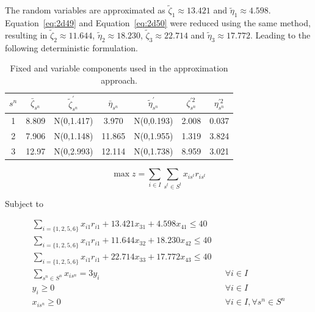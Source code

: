 \documentclass[a4paper,11pt]{article}
\begin{document}
The random variables are approximated as $\tilde{\zeta}_1 \approx 13.421$ and $\tilde{\eta}_1 \approx 4.598$. Equation~\ref{eq:2d49} and Equation~\ref{eq:2d50} were reduced using the same method, resulting in $\tilde{\zeta}_2 \approx 11.644$, $\tilde{\eta}_2 \approx 18.230$, $\tilde{\zeta}_3 \approx 22.714$ and $\tilde{\eta}_3 \approx 17.772$. Leading to the following deterministic formulation.


\begin{table}[]
\caption{Fixed and variable components used in the approximation approach.}
\label{tbl:q2d}
\vspace{12pt}
\centering
\begin{tabular}{ccccccc}
\hline
$s^n$ & $\bar{\zeta}_{s^n}$ & $\tilde{\zeta}_{s^n}^\prime$ & $\bar{\eta}_{s^n}$ & $\tilde{\eta}_{s^n}^\prime$ & $\zeta^{\prime2}_{s^n}$ & $\eta^{\prime2}_{s^n}$\\
\hline
1           & 8.809             & N(0,1.417)      & 3.970      & N(0,0.193) & 2.008 &0.037\\
2           & 7.906             & N(0,1.148)      & 11.865     & N(0,1.955) & 1.319 &3.824\\
3           & 12.97             & N(0,2.993)      & 12.114     & N(0,1.738) & 8.959&3.021\\
 
\hline
\end{tabular}
\end{table}




\begin{equation}
	\max z = \sum_{i\in I}\sum_{s^t \in S^t} x_{is^t}r_{is^t}
\end{equation}

Subject to

\begin{align}
\label{q2e:cons1}
	\sum_{i =\{1,2,5,6\}}x_{i1}r_{i1} + 13.421x_{31} + 4.598x_{41} \leq 40 && \\%
\label{q2e:cons2}
	\sum_{i =\{1,2,5,6\}}x_{i1}r_{i1} + 11.644x_{32} + 18.230x_{42} \leq 40 &&\\ %
\label{q2e:cons3}
	\sum_{i =\{1,2,5,6\}}x_{i1}r_{i1} + 22.714x_{33} + 17.772x_{43} \leq 40 &&\\ %
\label{q2e:cons4}
	\sum_{s^n \in S^n}x_{is^n}=3y_i &&  \forall i \in I \\
\label{q2e:cons5}
	 y_i \geq 0 && \forall i \in I\\
\label{q2e:cons6}
	 x_{is^n} \geq 0 && \forall i \in I,\forall s^n \in S^n 
\end{align}
\end{document}
